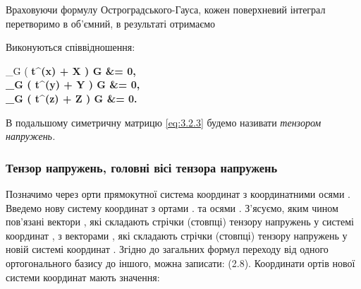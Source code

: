 Враховуючи формулу Остроградського-Гауса, кожен поверхневий інтеграл перетворимо в об'ємний, в результаті отримаємо
\begin{theorem}
	Виконуються співвідношення:
	\begin{system}
		\Iiint_G \left( \nabla \cdot \bf{t}^{(x)} + X \right) \diff G &= 0, \\
		\Iiint_G \left( \nabla \cdot \bf{t}^{(y)} + Y \right) \diff G &= 0, \\
		\Iiint_G \left( \nabla \cdot \bf{t}^{(z)} + Z \right) \diff G &= 0.
	\end{system}
\end{theorem}

\begin{definition}
	В подальшому симетричну матрицю \eqref{eq:3.2.3} будемо називати \it{тензором напружень}.
\end{definition}

\subsubsection{Тензор напружень, головні вісі тензора напружень}

Позначимо через   орти прямокутної система координат з координатними осями  . 
Введемо нову систему координат з ортами  . та осями  .
З'ясуємо, яким чином пов'язані вектори  , які складають стрічки (стовпці) тензору напружень у системі координат  , з векторами  , які складають стрічки (стовпці) тензору напружень у новій системі координат  .
Згідно до загальних формул переходу від одного ортогонального базису до іншого, можна записати:
   			(2.8).
Координати ортів нової системи координат мають значення:
 
 
 
